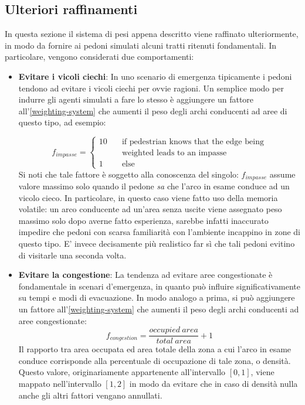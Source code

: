 \documentclass[12pt,a4paper,openright,oneside]{book}
\begin{document}
\subsection{Ulteriori raffinamenti}
In questa sezione il sistema di pesi appena descritto viene raffinato ulteriormente, in modo da fornire ai pedoni simulati alcuni tratti ritenuti fondamentali. In particolare, vengono considerati due comportamenti:
\begin{itemize}
 \item \textbf{Evitare i vicoli ciechi}: In uno scenario di emergenza tipicamente i pedoni tendono ad evitare i vicoli ciechi per ovvie ragioni. Un semplice modo per indurre gli agenti simulati a fare lo stesso è aggiungere un fattore all'\cref{weighting-system} che aumenti il peso degli archi conducenti ad aree di questo tipo, ad esempio:
 
 \begin{equation}
 f_{impasse} =
  \begin{cases}
    10       & \quad \text{if pedestrian knows that the edge being}\\
             & \quad \text{weighted leads to an impasse}\\
    1        & \quad \text{else}
  \end{cases}
 \end{equation}
 Si noti che tale fattore è soggetto alla conoscenza del singolo: \(f_{impasse}\) assume valore massimo solo quando il pedone \emph{sa} che l'arco in esame conduce ad un vicolo cieco. In particolare, in questo caso viene fatto uso della memoria volatile: un arco conducente ad un'area senza uscite viene assegnato peso massimo solo dopo averne fatto esperienza, sarebbe infatti inaccurato impedire che pedoni con scarsa familiarità con l'ambiente incappino in zone di questo tipo. E' invece decisamente più realistico far sì che tali pedoni evitino di visitarle una seconda volta.
 \item \textbf{Evitare la congestione}: La tendenza ad evitare aree congestionate è fondamentale in scenari d'emergenza, in quanto può influire significativamente su tempi e modi di evacuazione. In modo analogo a prima, si può aggiungere un fattore all'\cref{weighting-system} che aumenti il peso degli archi conducenti ad aree congestionate:
 \begin{equation}
 f_{congestion} = \frac{occupied\ area}{total\ area} + 1
 \end{equation}
 Il rapporto tra area occupata ed area totale della zona a cui l'arco in esame conduce corrisponde alla percentuale di occupazione di tale zona, o densità. Questo valore, originariamente appartenente all'intervallo \([0,1]\), viene mappato nell'intervallo \([1,2]\) in modo da evitare che in caso di densità nulla anche gli altri fattori vengano annullati.
 

\end{itemize}
\end{document}
